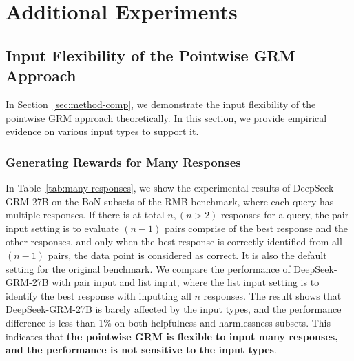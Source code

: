 \documentclass{article} %
\newcommand{\SGRM}{DeepSeek-GRM-27B\xspace}
\begin{document}
\section{Additional Experiments}\label{app:add-exp}

\subsection{Input Flexibility of the Pointwise GRM Approach}


In Section~\ref{sec:method-comp}, we demonstrate the input flexibility of the pointwise GRM approach theoretically. In this section, we provide empirical evidence on various input types to support it. 



\subsubsection{Generating Rewards for Many Responses}\label{app:many-response}



In Table~\ref{tab:many-responses}, we show the experimental results of \SGRM on the BoN subsets of the RMB benchmark, where each query has multiple responses. 
If there is at total $n, (n>2)$ responses for a query, 
the pair input setting is to evaluate $(n-1)$ pairs comprise of the best response and the other responses, and only when the best response is correctly identified from all $(n-1)$ pairs, the data point is considered as correct. It is also the default setting for the original benchmark. 
We compare the performance of \SGRM with pair input and list input, where the list input setting is to identify the best response with inputting all $n$ responses. 
The result shows that \SGRM is barely affected by the input types, and the performance difference is less than 1\% on both helpfulness and harmlessness subsets. This indicates that \textbf{the pointwise GRM is flexible to input many responses, and the performance is not sensitive to the input types}.
\end{document}
